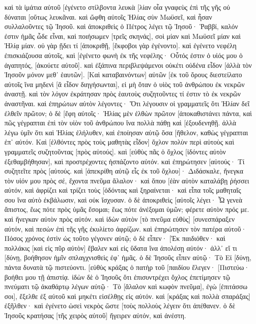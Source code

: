 καὶ τὰ ἱμάτια αὐτοῦ [ἐγένετο στίλβοντα λευκὰ [λίαν οἷα γναφεὺς ἐπὶ τῆς γῆς οὐ δύναται [οὕτως λευκᾶναι. 
καὶ ὤφθη αὐτοῖς Ἠλίας σὺν Μωϋσεῖ, καὶ ἦσαν συλλαλοῦντες τῷ Ἰησοῦ. 
καὶ ἀποκριθεὶς ὁ Πέτρος λέγει τῷ Ἰησοῦ· Ῥαββί, καλόν ἐστιν ἡμᾶς ὧδε εἶναι, καὶ ποιήσωμεν [τρεῖς σκηνάς], σοὶ μίαν καὶ Μωϋσεῖ μίαν καὶ Ἠλίᾳ μίαν. 
οὐ γὰρ ᾔδει τί [ἀποκριθῇ, [ἔκφοβοι γὰρ ἐγένοντο]. 
καὶ ἐγένετο νεφέλη ἐπισκιάζουσα αὐτοῖς, καὶ [ἐγένετο φωνὴ ἐκ τῆς νεφέλης· Οὗτός ἐστιν ὁ υἱός μου ὁ ἀγαπητός, [ἀκούετε αὐτοῦ]. 
καὶ ἐξάπινα περιβλεψάμενοι οὐκέτι οὐδένα εἶδον [ἀλλὰ τὸν Ἰησοῦν μόνον μεθ᾽ ἑαυτῶν]. 
[Καὶ καταβαινόντων] αὐτῶν [ἐκ τοῦ ὄρους διεστείλατο αὐτοῖς ἵνα μηδενὶ [ἃ εἶδον διηγήσωνται], εἰ μὴ ὅταν ὁ υἱὸς τοῦ ἀνθρώπου ἐκ νεκρῶν ἀναστῇ. 
καὶ τὸν λόγον ἐκράτησαν πρὸς ἑαυτοὺς συζητοῦντες τί ἐστιν τὸ ἐκ νεκρῶν ἀναστῆναι. 
καὶ ἐπηρώτων αὐτὸν λέγοντες· Ὅτι λέγουσιν οἱ γραμματεῖς ὅτι Ἠλίαν δεῖ ἐλθεῖν πρῶτον; 
ὁ δὲ [ἔφη αὐτοῖς· Ἠλίας μὲν ἐλθὼν πρῶτον [ἀποκαθιστάνει πάντα, καὶ πῶς γέγραπται ἐπὶ τὸν υἱὸν τοῦ ἀνθρώπου ἵνα πολλὰ πάθῃ καὶ [ἐξουδενηθῇ. 
ἀλλὰ λέγω ὑμῖν ὅτι καὶ Ἠλίας ἐλήλυθεν, καὶ ἐποίησαν αὐτῷ ὅσα [ἤθελον, καθὼς γέγραπται ἐπ᾽ αὐτόν. 
Καὶ [ἐλθόντες πρὸς τοὺς μαθητὰς εἶδον] ὄχλον πολὺν περὶ αὐτοὺς καὶ γραμματεῖς συζητοῦντας [πρὸς αὐτούς]. 
καὶ [εὐθὺς πᾶς ὁ ὄχλος [ἰδόντες αὐτὸν ἐξεθαμβήθησαν], καὶ προστρέχοντες ἠσπάζοντο αὐτόν. 
καὶ ἐπηρώτησεν [αὐτούς· Τί συζητεῖτε πρὸς [αὑτούς. 
καὶ [ἀπεκρίθη αὐτῷ εἷς ἐκ τοῦ ὄχλου]· Διδάσκαλε, ἤνεγκα τὸν υἱόν μου πρὸς σέ, ἔχοντα πνεῦμα ἄλαλον· 
καὶ ὅπου [ἐὰν αὐτὸν καταλάβῃ ῥήσσει αὐτόν, καὶ ἀφρίζει καὶ τρίζει τοὺς [ὀδόντας καὶ ξηραίνεται· καὶ εἶπα τοῖς μαθηταῖς σου ἵνα αὐτὸ ἐκβάλωσιν, καὶ οὐκ ἴσχυσαν. 
ὁ δὲ ἀποκριθεὶς [αὐτοῖς λέγει· Ὦ γενεὰ ἄπιστος, ἕως πότε πρὸς ὑμᾶς ἔσομαι; ἕως πότε ἀνέξομαι ὑμῶν; φέρετε αὐτὸν πρός με. 
καὶ ἤνεγκαν αὐτὸν πρὸς αὐτόν. καὶ ἰδὼν αὐτὸν [τὸ πνεῦμα εὐθὺς] [συνεσπάραξεν αὐτόν, καὶ πεσὼν ἐπὶ τῆς γῆς ἐκυλίετο ἀφρίζων. 
καὶ ἐπηρώτησεν τὸν πατέρα αὐτοῦ· Πόσος χρόνος ἐστὶν ὡς τοῦτο γέγονεν αὐτῷ; ὁ δὲ εἶπεν· [Ἐκ παιδιόθεν· 
καὶ πολλάκις [καὶ εἰς πῦρ αὐτὸν] ἔβαλεν καὶ εἰς ὕδατα ἵνα ἀπολέσῃ αὐτόν· ἀλλ᾽ εἴ τι [δύνῃ, βοήθησον ἡμῖν σπλαγχνισθεὶς ἐφ᾽ ἡμᾶς. 
ὁ δὲ Ἰησοῦς εἶπεν αὐτῷ· Τὸ Εἰ [δύνῃ, πάντα δυνατὰ τῷ πιστεύοντι. 
[εὐθὺς κράξας ὁ πατὴρ τοῦ [παιδίου ἔλεγεν· [Πιστεύω· βοήθει μου τῇ ἀπιστίᾳ. 
ἰδὼν δὲ ὁ Ἰησοῦς ὅτι ἐπισυντρέχει ὄχλος ἐπετίμησεν τῷ πνεύματι τῷ ἀκαθάρτῳ λέγων αὐτῷ· Τὸ [ἄλαλον καὶ κωφὸν πνεῦμα], ἐγὼ [ἐπιτάσσω σοι], ἔξελθε ἐξ αὐτοῦ καὶ μηκέτι εἰσέλθῃς εἰς αὐτόν. 
καὶ [κράξας καὶ πολλὰ σπαράξας] ἐξῆλθεν· καὶ ἐγένετο ὡσεὶ νεκρὸς ὥστε [τοὺς πολλοὺς λέγειν ὅτι ἀπέθανεν. 
ὁ δὲ Ἰησοῦς κρατήσας [τῆς χειρὸς αὐτοῦ] ἤγειρεν αὐτόν, καὶ ἀνέστη. 
